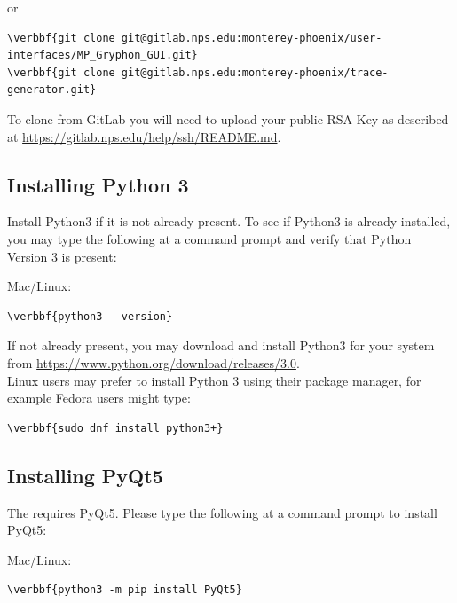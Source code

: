 \documentclass[11pt,fleqn]{article} %
\begin{document}
or
\begin{Verbatim}[commandchars=\\\{\}]
\verbbf{git clone git@gitlab.nps.edu:monterey-phoenix/user-interfaces/MP_Gryphon_GUI.git}
\verbbf{git clone git@gitlab.nps.edu:monterey-phoenix/trace-generator.git}
\end{Verbatim}

To clone from GitLab you will need to upload your public RSA Key as described at \url{https://gitlab.nps.edu/help/ssh/README.md}.\\

\subsection{Installing Python 3}
Install Python3 if it is not already present. To see if Python3 is already installed, you may type the following at a command prompt and verify that Python Version 3 is present:
\begin{compactitem}
\item Mac/Linux:
\begin{Verbatim}[commandchars=\\\{\}]
\verbbf{python3 --version}
\end{Verbatim}
\end{compactitem}
If not already present, you may download and install Python3 for your system from \url{https://www.python.org/download/releases/3.0}.\\

Linux users may prefer to install Python 3 using their package manager, for example Fedora users might type:
\begin{Verbatim}[commandchars=\\\{\}]
\verbbf{sudo dnf install python3+}
\end{Verbatim}

\subsection{Installing PyQt5}
The \ggui requires PyQt5.
Please type the following at a command prompt to install PyQt5:
\begin{compactitem}
\item Mac/Linux:
\begin{Verbatim}[commandchars=\\\{\}]
\verbbf{python3 -m pip install PyQt5}
\end{Verbatim}
\end{compactitem}
\end{document}
